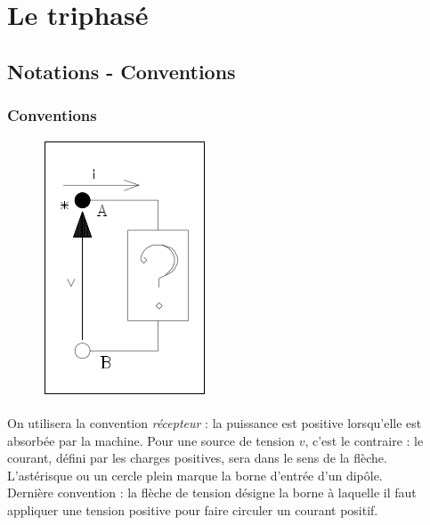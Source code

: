 \chapter{Le triphasé}
\section{Notations - Conventions}
	
\subsection{Conventions}
\begin{figure}
	\vspace{-5mm}
	\includegraphics[scale=0.4]{ch1/image1.png}
\end{figure}
On utilisera la convention \textit{récepteur} : la puissance 
est positive lorsqu'elle est absorbée par la machine. Pour une 
source de tension $v$, c'est le contraire : le courant, défini par 
les charges positives, sera dans le sens de la flèche.\\

L'astérisque ou un cercle plein
marque la borne d'entrée d'un dipôle.\\
	
Dernière convention : la flèche de tension désigne la borne à 
laquelle il faut appliquer une tension positive pour faire circuler 
un courant positif.
	
